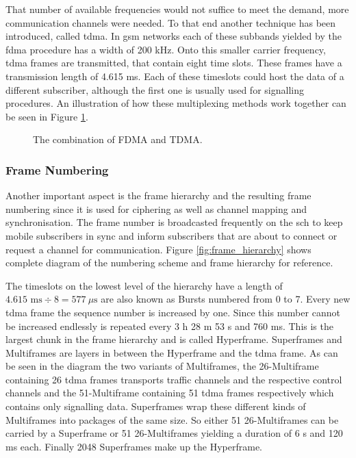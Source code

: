 That number of available frequencies would not suffice to meet the demand, more communication channels were needed.
To that end another technique has been introduced, called \gls{tdma}.
In \gls{gsm} networks each of these subbands yielded by the \gls{fdma} procedure has a width of 200 kHz.
Onto this smaller carrier frequency, \gls{tdma} frames are transmitted, that contain eight time slots.
These frames have a transmission length of 4.615 ms.
Each of these timeslots could host the data of a different subscriber, although the first one is usually used for signalling procedures.
An illustration of how these multiplexing methods work together can be seen in Figure \ref{fig:fdma_tdma}.

\begin{figure}
	\centering
	\caption{The combination of FDMA and TDMA.}
	\label{fig:fdma_tdma}
\end{figure}

\subsubsection{Frame Numbering}
Another important aspect is the frame hierarchy and the resulting frame numbering since it is used for ciphering as well as channel mapping and synchronisation.
The frame number is broadcasted frequently on the \gls{sch} to keep mobile subscribers in sync and inform subscribers that are about to connect or request a channel for communication.
Figure \ref{fig:frame_hierarchy} shows complete diagram of the numbering scheme and frame hierarchy for reference.

The timeslots on the lowest level of the hierarchy have a length of $4.615\text{ ms} \div 8 = 577~\mu\text{s}$ are also known as Bursts numbered from 0 to 7.
Every new \gls{tdma} frame the sequence number is increased by one.
Since this number cannot be increased endlessly is repeated every 3 h 28 m 53 s and 760 ms.
This is the largest chunk in the frame hierarchy and is called Hyperframe.
Superframes and Multiframes are layers in between the Hyperframe and the \gls{tdma} frame.
As can be seen in the diagram the two variants of Multiframes, the 26-Multiframe containing 26 \gls{tdma} frames transports traffic channels and the respective control channels and the 51-Multiframe containing 51 \gls{tdma} frames respectively which contains only signalling data.
Superframes wrap these different kinds of Multiframes into packages of the same size.
So either 51 26-Multiframes can be carried by a Superframe or 51 26-Multiframes yielding a duration of 6 s and 120 ms each.
Finally 2048 Superframes make up the Hyperframe.

